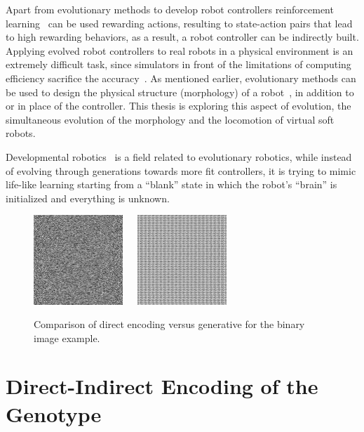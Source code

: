 Apart from evolutionary methods to develop robot controllers reinforcement learning~\citep{hayes1994robot,mahadevan1992automatic} can be used rewarding actions, resulting to state-action pairs that lead to high rewarding behaviors, as a result, a robot controller can be indirectly built. Applying evolved robot controllers to real robots in a physical environment is an extremely difficult task, since simulators in front of the limitations of computing efficiency sacrifice the accuracy~\citep{jakobi1995noise}. As mentioned earlier, evolutionary methods can be used to design the physical structure (morphology) of a robot~\citep{hiller2010evolving}, in addition to or in place of the controller. This thesis is exploring this aspect of evolution, the simultaneous evolution of the morphology and the locomotion of virtual soft robots. 

Developmental robotics~\citep{lungarella2003developmental,asada2001cognitive,weng2004developmental,asada2009cognitive} is a field related to evolutionary robotics,  while instead of evolving through generations towards more fit controllers, it is trying to mimic life-like learning starting from a ``blank'' state in which the robot's ``brain'' is initialized and everything is unknown.

\begin{figure}[t!]
\centering
\includegraphics[width=0.3\textwidth]{../Figures/Misc/direct.jpg}\  \   \   
\includegraphics[width=0.3\textwidth]{../Figures/Misc/indirect.jpg}
\caption{Comparison of direct encoding versus generative for the binary image example.}
\label{fig:directVsIndirectEncoding}
\end{figure}


\section{Direct-Indirect Encoding of the Genotype}
\label{DirectIndirect}

